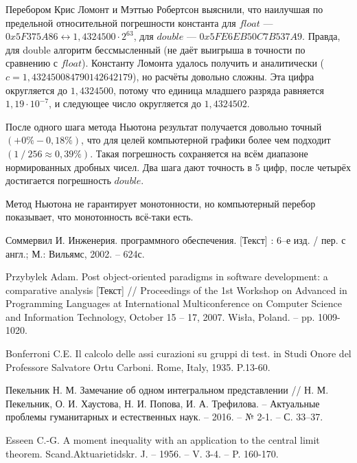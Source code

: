 \documentclass{book}
\begin{document}
 Перебором Крис Ломонт и Мэттью Робертсон выяснили, что наилучшая по предельной относительной погрешности константа для $float$ --- $0x5F375A86 \leftrightarrow 1,4324500·2^{63}$, для $double$ --- $0x5FE6EB50C7B537A9$. Правда, для double алгоритм бессмысленный (не даёт выигрыша в точности по сравнению с $float$). Константу Ломонта удалось получить и аналитически ($c = 1,432450084790142642179$), но расчёты довольно сложны. Эта цифра округляется до $1,4324500$, потому что единица младшего разряда равняется $1,19·10^{-7}$, и следующее число округляется до $1,4324502$.



После одного шага метода Ньютона результат получается довольно точный $(+0\% -0,18\%)$, что для целей компьютерной графики более чем подходит $(1⁄256 \approx 0,39\%)$. Такая погрешность сохраняется на всём диапазоне нормированных дробных чисел. Два шага дают точность в 5 цифр, после четырёх достигается погрешность $double$.

Метод Ньютона не гарантирует монотонности, но компьютерный перебор показывает, что монотонность всё-таки есть.

\begin{thebibliography}{5}
Соммервил И. Инженерия. программного обеспечения. [Текст] : 6--е изд. / пер. с англ.; М.: Вильямс, 2002. -- 624с.

Przybylek Adam. Post object-oriented paradigms in software development: a comparative analysis [Текст] // Proceedings of the 1st Workshop on Advanced in Programming Languages at International Multiconference on Computer Science and Information Technology, October 15 -- 17, 2007. Wisła, Poland. -- pp. 1009-1020.

 Bonferroni C.E. Il calcolo delle assi curazioni su gruppi di test. in Studi
Onore del Professore Salvatore Ortu Carboni. Rome, Italy, 1935. P.13-60.

Пекельник Н. М. Замечание об одном интегральном представлении // Н. М. Пекельник, О. И. Хаустова, Н. И. Попова, И. А. Трефилова. -- Актуальные проблемы гуманитарных и естественных наук. -- 2016. -- № 2-1. -- С. 33--37. 


 Esseen C.-G. A moment inequality with an application to the central limit theorem. Scand.Aktuarietidskr. J. – 1956. – V. 3-4. – P. 160-170.

\end{thebibliography}
\end{document}
